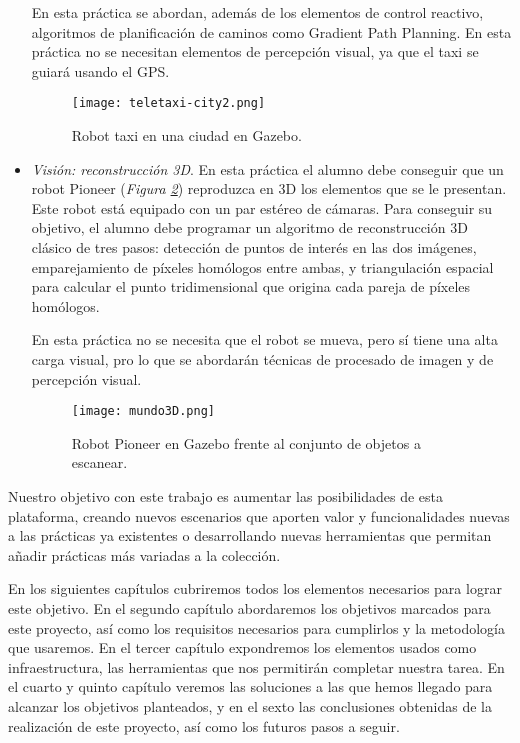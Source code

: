 \begin{itemize}
	En esta práctica se abordan, además de los elementos de control reactivo, algoritmos de planificación de caminos como Gradient Path Planning. En esta práctica no se necesitan elementos de percepción visual, ya que el taxi se guiará usando el GPS.

\begin{figure}[h]
	\centering\texttt{[image: teletaxi-city2.png]}
	\caption{Robot taxi en una ciudad en Gazebo.}
	\label{fig:teletaxi}
\end{figure}
	
	\item \textit{Visión: reconstrucción 3D}. En esta práctica el alumno debe conseguir que un robot Pioneer (\textit{Figura \ref{fig:mundo3D}}) reproduzca en 3D los elementos que se le presentan. Este robot está equipado con un par estéreo de cámaras. Para conseguir su objetivo, el alumno debe programar un algoritmo de reconstrucción 3D clásico de tres pasos: detección de puntos de interés en las dos imágenes, emparejamiento de píxeles homólogos entre ambas, y triangulación espacial para calcular el punto tridimensional que origina cada pareja de píxeles homólogos.
	
	En esta práctica no se necesita que el robot se mueva, pero sí tiene una alta carga visual, pro lo que se abordarán técnicas de procesado de imagen y de percepción visual.
	
\begin{figure}[h]
	\centering\texttt{[image: mundo3D.png]}
	\caption{Robot Pioneer en Gazebo frente al conjunto de objetos a escanear.}
	\label{fig:mundo3D}
\end{figure}

\end{itemize}

Nuestro objetivo con este trabajo es aumentar las posibilidades de esta plataforma, creando nuevos escenarios que aporten valor y funcionalidades nuevas a las prácticas ya existentes o desarrollando nuevas herramientas que permitan añadir prácticas más variadas a la colección.

En los siguientes capítulos cubriremos todos los elementos necesarios para lograr este objetivo. En el segundo capítulo abordaremos los objetivos marcados para este proyecto, así como los requisitos necesarios para cumplirlos y la metodología que usaremos. En el tercer capítulo expondremos los elementos usados como infraestructura, las herramientas que nos permitirán completar nuestra tarea. En el cuarto y quinto capítulo veremos las soluciones a las que hemos llegado para alcanzar los objetivos planteados, y en el sexto las conclusiones obtenidas de la realización de este proyecto, así como los futuros pasos a seguir.












